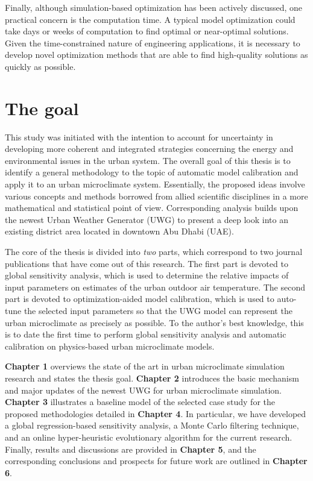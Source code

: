 Finally, although simulation-based optimization has been actively discussed, one practical concern is the computation time. A typical model optimization could take days or weeks of computation to find optimal or near-optimal solutions. Given the time-constrained nature of engineering applications, it is necessary to develop novel optimization methods that are able to find high-quality solutions as quickly as possible.

\section{The goal}

This study was initiated with the intention to account for uncertainty in developing more coherent and integrated strategies concerning the energy and environmental issues in the urban system. The overall goal of this thesis is to identify a general methodology to the topic of automatic model calibration and apply it to an urban microclimate system. Essentially, the proposed ideas involve various concepts and methods borrowed from allied scientific disciplines in a more mathematical and statistical point of view. Corresponding analysis builds upon the newest Urban Weather Generator (UWG) to present a deep look into an existing district area located in downtown Abu Dhabi (UAE).

The core of the thesis is divided into \textit{two} parts, which correspond to two journal publications \cite{mao2017global,mao2018optimization} that have come out of this research. The first part is devoted to global sensitivity analysis, which is used to determine the relative impacts of input parameters on estimates of the urban outdoor air temperature. The second part is devoted to optimization-aided model calibration, which is used to auto-tune the selected input parameters so that the UWG model can represent the urban microclimate as precisely as possible. To the author's best knowledge, this is to date the first time to perform global sensitivity analysis and automatic calibration on physics-based urban microclimate models.

\textbf{Chapter 1} overviews the state of the art in urban microclimate simulation research and states the thesis goal. \textbf{Chapter 2} introduces the basic mechanism and major updates of the newest UWG for urban microclimate simulation. \textbf{Chapter 3} illustrates a baseline model of the selected case study for the proposed methodologies detailed in \textbf{Chapter 4}. In particular, we have developed a global regression-based sensitivity analysis, a Monte Carlo filtering technique, and an online hyper-heuristic evolutionary algorithm for the current research. Finally, results and discussions are provided in \textbf{Chapter 5}, and the corresponding conclusions and prospects for future work are outlined in \textbf{Chapter 6}.

